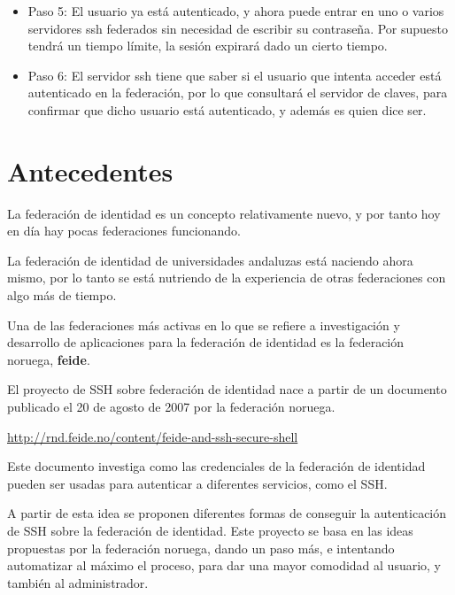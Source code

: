 \begin{itemize}
        \item{Paso 5:} El usuario ya está autenticado, y ahora puede
        entrar en uno o varios servidores ssh federados sin necesidad de
        escribir su contraseña. Por supuesto tendrá un tiempo límite,
        la sesión expirará dado un cierto tiempo.

        \item{Paso 6:} El servidor ssh tiene que saber si el usuario
        que intenta acceder está autenticado en la federación, por lo
        que consultará el servidor de claves, para confirmar que dicho
        usuario está autenticado, y además es quien dice ser.

    \end{itemize}


\newpage
\section{Antecedentes}

    La federación de identidad es un concepto relativamente nuevo, y
    por tanto hoy en día hay pocas federaciones funcionando.

    La federación de identidad de universidades andaluzas está
    naciendo ahora mismo, por lo tanto se está nutriendo de la
    experiencia de otras federaciones con algo más de tiempo.

    Una de las federaciones más activas en lo que se refiere a
    investigación y desarrollo de aplicaciones para la federación de
    identidad es la federación noruega, \textbf{feide}.

    El proyecto de SSH sobre federación de identidad nace a partir de
    un documento publicado el 20 de agosto de 2007 por la federación
    noruega.

    \href{http://rnd.feide.no/content/feide-and-ssh-secure-shell}{http://rnd.feide.no/content/feide-and-ssh-secure-shell}

    Este documento investiga como las credenciales de la federación
    de identidad pueden ser usadas para autenticar a diferentes
    servicios, como el SSH.

    A partir de esta idea se proponen diferentes formas de conseguir
    la autenticación de SSH sobre la federación de identidad.
    Este proyecto se basa en las ideas propuestas por la federación
    noruega, dando un paso más, e intentando automatizar al máximo el
    proceso, para dar una mayor comodidad al usuario, y también al
    administrador.


